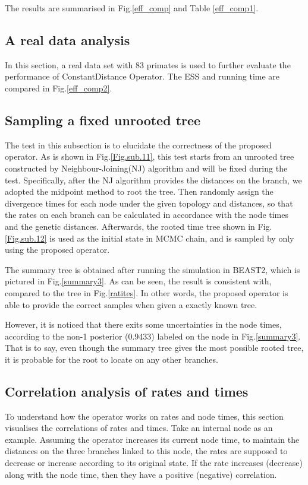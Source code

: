 \documentclass{bmcart}
\begin{document}
The results are summarised in Fig.\ref{eff_comp} and Table \ref{eff_comp1}.
\subsection*{A real data analysis}
In this section, a real data set with 83 primates is used to further evaluate the performance of ConstantDistance Operator. The ESS and running time are compared in Fig.\ref{eff_comp2}.

\subsection*{Sampling a fixed unrooted tree}
The test in this subsection is to elucidate the correctness of the proposed operator. As is shown in Fig.\ref{Fig.sub.11}, this test starts from an unrooted tree constructed by Neighbour-Joining(NJ) algorithm and will be fixed during the test. Specifically, after the NJ algorithm provides the distances on the branch, we adopted the midpoint method to root the tree. Then randomly assign the divergence times for each node under the given topology and distances, so that the rates on each branch can be calculated in accordance with the node times and the genetic distances. Afterwards, the rooted time tree shown in Fig.\ref{Fig.sub.12} is used as the initial state in MCMC chain, and is sampled by only using the proposed operator.

The summary tree is obtained after running the simulation in BEAST2, which is pictured in Fig.\ref{summary3}. As can be seen, the result is consistent with, compared to the tree in Fig.\ref{ratites}. In other words, the proposed operator is able to provide the correct samples when given a exactly known tree.

However, it is noticed that there exits some uncertainties in the node times, according to the non-1 posterior (0.9433) labeled on the node in Fig.\ref{summary3}. That is to say, even though the summary tree gives the most possible rooted tree, it is probable for the root to locate on any other branches.

\subsection*{Correlation analysis of rates and times}
To understand how the operator works on rates and node times, this section visualises the correlations of rates and times. Take an internal node as an example. Assuming the operator increases its current node time, to maintain the distances on the three branches linked to this node, the rates are supposed to decrease or increase according to its original state. If the rate increases  (decrease) along with the node time, then they have a positive (negative) correlation. 
\end{document}
